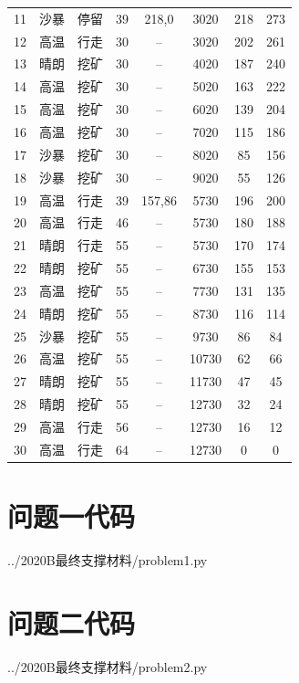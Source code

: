 \documentclass{cumcmthesis}
\numberwithin{equation}{section}
\numberwithin{figure}{section}
\numberwithin{table}{section}
\begin{document}
\begin{appendices}
{\begin{longtable}{cccccccc}
    11 & 沙暴 & 停留 & 39 & 218,0 & 3020 & 218 & 273 \\
    12 & 高温 & 行走 & 30 & -- & 3020 & 202 & 261 \\
    13 & 晴朗 & 挖矿 & 30 & -- & 4020 & 187 & 240 \\
    14 & 高温 & 挖矿 & 30 & -- & 5020 & 163 & 222 \\
    15 & 高温 & 挖矿 & 30 & -- & 6020 & 139 & 204 \\
    16 & 高温 & 挖矿 & 30 & -- & 7020 & 115 & 186 \\
    17 & 沙暴 & 挖矿 & 30 & -- & 8020 & 85 & 156 \\
    18 & 沙暴 & 挖矿 & 30 & -- & 9020 & 55 & 126 \\
    19 & 高温 & 行走 & 39 & 157,86 & 5730 & 196 & 200 \\
    20 & 高温 & 行走 & 46 & -- & 5730 & 180 & 188 \\
    21 & 晴朗 & 行走 & 55 & -- & 5730 & 170 & 174 \\
    22 & 晴朗 & 挖矿 & 55 & -- & 6730 & 155 & 153 \\
    23 & 高温 & 挖矿 & 55 & -- & 7730 & 131 & 135 \\
    24 & 晴朗 & 挖矿 & 55 & -- & 8730 & 116 & 114 \\
    25 & 沙暴 & 挖矿 & 55 & -- & 9730 & 86 & 84 \\
    26 & 高温 & 挖矿 & 55 & -- & 10730 & 62 & 66 \\
    27 & 晴朗 & 挖矿 & 55 & -- & 11730 & 47 & 45 \\
    28 & 晴朗 & 挖矿 & 55 & -- & 12730 & 32 & 24 \\
    29 & 高温 & 行走 & 56 & -- & 12730 & 16 & 12 \\
    30 & 高温 & 行走 & 64 & -- & 12730 & 0 & 0 \\
     
\end{longtable}
}

\section{问题一代码}

    {../2020B最终支撑材料/problem1.py}
\newpage

\section{问题二代码}

    {../2020B最终支撑材料/problem2.py}
\newpage


\end{appendices}
\end{document}
